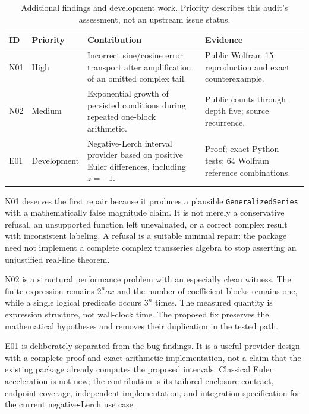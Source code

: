 \documentclass[11pt,a4paper]{article}
\begin{document}
\begin{table}[htbp]
\centering\small
\begin{tabularx}{\textwidth}{@{}P{12mm}P{21mm}Y P{37mm}@{}}
\toprule
ID & Priority & Contribution & Evidence\\
\midrule
N01 & High & Incorrect sine/cosine error transport after amplification of an omitted complex tail. & Public Wolfram 15 reproduction and exact counterexample.\\[4pt]
N02 & Medium & Exponential growth of persisted conditions during repeated one-block arithmetic. & Public counts through depth five; source recurrence.\\[4pt]
E01 & Development & Negative-Lerch interval provider based on positive Euler differences, including $z=-1$. & Proof; exact Python tests; 64 Wolfram reference combinations.\\
\bottomrule
\end{tabularx}
\caption{Additional findings and development work. Priority describes this audit's assessment, not an upstream issue status.}
\end{table}

N01 deserves the first repair because it produces a plausible \texttt{GeneralizedSeries} with a mathematically false magnitude claim. It is not merely a conservative refusal, an unsupported function left unevaluated, or a correct complex result with inconsistent labeling. A refusal is a suitable minimal repair: the package need not implement a complete complex transseries algebra to stop asserting an unjustified real-line theorem.

N02 is a structural performance problem with an especially clean witness. The finite expression remains $2^n a x$ and the number of coefficient blocks remains one, while a single logical predicate occurs $3^n$ times. The measured quantity is expression structure, not wall-clock time. The proposed fix preserves the mathematical hypotheses and removes their duplication in the tested path.

E01 is deliberately separated from the bug findings. It is a useful provider design with a complete proof and exact arithmetic implementation, not a claim that the existing package already computes the proposed intervals. Classical Euler acceleration is not new; the contribution is its tailored enclosure contract, endpoint coverage, independent implementation, and integration specification for the current negative-Lerch use case.\cite{euler,dirichlet}
\end{document}
